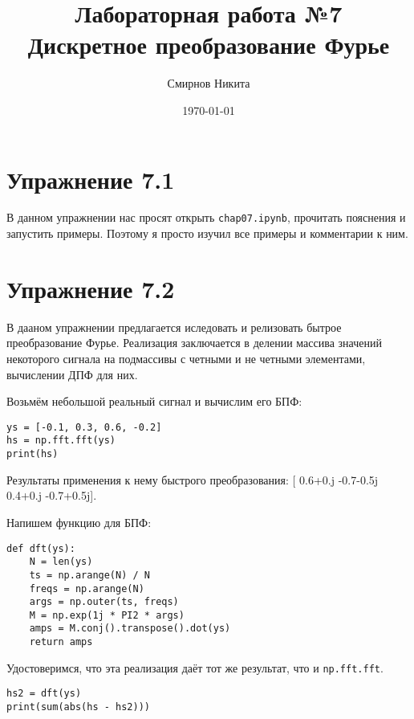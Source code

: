 \documentclass[a4paper,12pt]{report}
\title{Лабораторная работа №7\\Дискретное преобразование Фурье}
\author{Смирнов Никита}
\date{\today}
\begin{document}
\maketitle
\tableofcontents
\lstlistoflistings

\maketitle

\chapter{Упражнение 7.1}

В данном упражнении нас просят открыть \texttt{chap07.ipynb}, прочитать пояснения и запустить примеры. Поэтому я просто изучил все примеры и комментарии к ним.


\chapter{Упражнение 7.2}

В дааном упражнении предлагается иследовать и релизовать бытрое преобразование Фурье. Реализация заключается в делении массива значений некоторого сигнала на подмассивы с четными и не четными элементами, вычислении ДПФ для них.

Возьмём небольшой реальный сигнал и вычислим его БПФ:

\begin{lstlisting}[caption=Вычисление БПФ при помощи \texttt{np.fft.fft}]
ys = [-0.1, 0.3, 0.6, -0.2]
hs = np.fft.fft(ys)
print(hs)
\end{lstlisting}

Результаты применения к нему быстрого преобразования: [ 0.6+0.j  -0.7-0.5j  0.4+0.j  -0.7+0.5j].

Напишем функцию для БПФ:

\begin{lstlisting}[caption=Функция \texttt{dft}]
def dft(ys):
    N = len(ys)
    ts = np.arange(N) / N
    freqs = np.arange(N)
    args = np.outer(ts, freqs)
    M = np.exp(1j * PI2 * args)
    amps = M.conj().transpose().dot(ys)
    return amps
\end{lstlisting}

Удостоверимся, что эта реализация даёт тот же результат, что и \texttt{np.fft.fft}.

\begin{lstlisting}[caption=Сравнение реализаций]
hs2 = dft(ys)
print(sum(abs(hs - hs2)))
\end{lstlisting}
\end{document}
